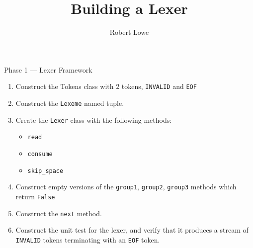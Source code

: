 \documentclass[handout]{beamer}
\title{Building a Lexer}
\author{Robert Lowe}
\institute[Southeast Missouri State University] %
{
  Department of Computer Science\\
  Southeast Missouri State University
}
\date[]{}
\begin{document}
\begin{frame}
  \titlepage
\end{frame}



\begin{frame}{Phase 1 --- Lexer Framework}
    \begin{enumerate}
        \item Construct the Tokens class with 2 tokens, \texttt{INVALID} and \texttt{EOF}
        \item Construct the \texttt{Lexeme} named tuple.
        \item Create the \texttt{Lexer} class with the following methods:
        \begin{itemize}
            \item \texttt{read}
            \item \texttt{consume}
            \item \texttt{skip\_space}
        \end{itemize}
        \item Construct empty versions of the \texttt{group1}, \texttt{group2}, \texttt{group3} methods which return \texttt{False}
        \item Construct the \texttt{next} method.
        \item Construct the unit test for the lexer, and verify that it produces a stream of \texttt{INVALID} tokens terminating with an \texttt{EOF} token.
    \end{enumerate}
\end{frame}
\end{document}
